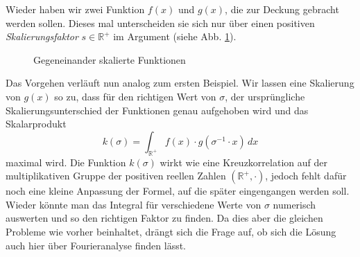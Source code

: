 Wieder haben wir zwei Funktion $f(x)$ und $g(x)$, die zur Deckung gebracht 
werden sollen. Dieses mal unterscheiden sie sich nur 
über einen positiven {\em Skalierungsfaktor} $s \in \mathbb{R^+}$ im 
Argument (siehe Abb. \ref{fig:mellin:f2}).
\begin{figure}
    \centering
    \caption{Gegeneinander skalierte Funktionen
    \label{fig:mellin:f2}}
\end{figure}
Das Vorgehen verläuft nun analog zum ersten Beispiel. Wir lassen eine 
Skalierung von $g(x)$ so zu, dass für den richtigen Wert von
$\sigma$, der ursprüngliche Skalierungsunterschied der Funktionen genau 
aufgehoben wird und das Skalarprodukt
\begin{equation}
    k(\sigma) 
    = \int_\mathbb{R^+} f(x) \cdot g(\sigma^{-1} \cdot x)\,dx
    \label{mellin:ksigma}
\end{equation}
maximal wird.
Die Funktion $k(\sigma)$ wirkt wie eine Kreuzkorrelation auf der 
multiplikativen Gruppe der positiven reellen Zahlen $(\mathbb{R^+},\cdot)$, 
jedoch fehlt dafür noch eine kleine Anpassung der Formel, auf die später 
eingengangen werden soll. 
Wieder könnte man das Integral für verschiedene Werte von $\sigma$ 
numerisch auswerten und so den richtigen Faktor zu finden. 
Da dies aber die gleichen Probleme wie vorher beinhaltet, drängt sich die 
Frage auf, ob sich die Lösung auch hier über Fourieranalyse finden lässt.